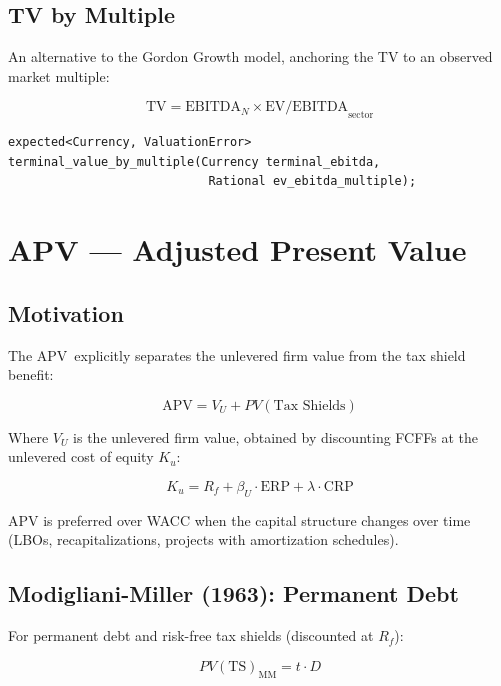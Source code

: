 \documentclass[12pt, a4paper, oneside]{book}
\newcommand{\ERP}{\ensuremath{\mathrm{ERP}}}
\newcommand{\CRP}{\ensuremath{\mathrm{CRP}}}
\newcommand{\TV}{\ensuremath{\mathrm{TV}}}
\newcommand{\APV}{\ensuremath{\mathrm{APV}}}
\newcommand{\Ku}{K_u}
\newcommand{\Rf}{R_f}
\begin{document}
\section{TV by Multiple}

An alternative to the Gordon Growth model, anchoring the TV to an observed
market multiple:

\begin{equation}
  \TV = \text{EBITDA}_{N} \times \text{EV/EBITDA}_{\text{sector}}
\end{equation}

\begin{lstlisting}[style=cpp]
expected<Currency, ValuationError>
terminal_value_by_multiple(Currency terminal_ebitda,
                            Rational ev_ebitda_multiple);
\end{lstlisting}

\chapter{APV --- Adjusted Present Value}

\section{Motivation}

The \APV\ explicitly separates the unlevered firm value from the tax shield
benefit:

\begin{equation}
  \APV = V_U + PV(\text{Tax Shields})
\end{equation}

Where $V_U$ is the unlevered firm value, obtained by discounting FCFFs at the
unlevered cost of equity $\Ku$:

\[
  \Ku = \Rf + \beta_U \cdot \ERP + \lambda \cdot \CRP
\]

APV is preferred over WACC when the capital structure changes over time
(LBOs, recapitalizations, projects with amortization schedules).

\section{Modigliani-Miller (1963): Permanent Debt}

For permanent debt and risk-free tax shields (discounted at $\Rf$):

\begin{equation}
  PV(\text{TS})_{\text{MM}} = t \cdot D
  \label{eq:ts_mm}
\end{equation}
\end{document}
